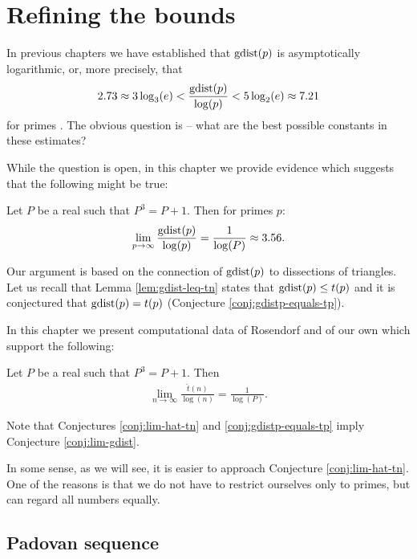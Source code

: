 \chapter{Refining the bounds}
\label{chap:bounds}

In previous chapters we have established that $\mathop{\mathrm{gdist}}(p)$ is asymptotically logarithmic, or, more precisely, that
\begin{align}
	2.73 \approx 3 \log_3(e) < \frac{\mathop{\mathrm{gdist}}(p)}{\log(p)} < 5 \log_2(e) \approx 7.21
\end{align}
for primes . The obvious question is -- what are the best possible constants in these estimates?

While the question is open, in this chapter we provide evidence which suggests that the following might be true:

\begin{conj}
\label{conj:lim-gdist}
Let $P$ be a real such that $P^3=P+1$. Then for primes $p$:
\begin{align}
	\lim_{p \rightarrow \infty} \frac{\mathop{\mathrm{gdist}}(p)}{\log(p)} = \frac{1}{\log(P)} \approx 3.56.
\end{align}
\end{conj}%

Our argument is based on the connection of $\mathop{\mathrm{gdist}}(p)$ to dissections of triangles. Let us recall that Lemma \ref{lem:gdist-leq-tn} states that $\mathop{\mathrm{gdist}}(p) \leq t(p)$ and it is conjectured that $\mathop{\mathrm{gdist}}(p) = t(p)$ (Conjecture \ref{conj:gdistp-equals-tp}).

In this chapter we present computational data of Rosendorf \cite{Rosendorf04} and of our own which support the following:

\begin{conj}
\label{conj:lim-hat-tn}
Let $P$ be a real such that $P^3=P+1$. Then
\begin{align}
	\lim_{n \rightarrow \infty} \frac{\hat t(n)}{\log(n)} = \frac{1}{\log(P)}.
\end{align}
\end{conj}%

Note that Conjectures \ref{conj:lim-hat-tn} and \ref{conj:gdistp-equals-tp} imply Conjecture \ref{conj:lim-gdist}.

In some sense, as we will see, it is easier to approach Conjecture \ref{conj:lim-hat-tn}. One of the reasons is that we do not have to restrict ourselves only to primes, but can regard all numbers equally.

\section{Padovan sequence}

